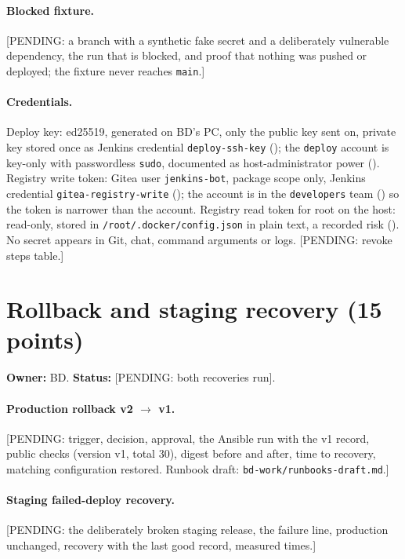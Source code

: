 \paragraph{Blocked fixture.} [PENDING: a branch with a synthetic fake secret and a deliberately vulnerable dependency, the run that is blocked, and proof that nothing was pushed
or deployed; the fixture never reaches \texttt{main}.]

\paragraph{Credentials.} Deploy key: ed25519, generated on BD's PC, only the public key sent on, private key stored once as Jenkins credential
\texttt{deploy-ssh-key} (); the \texttt{deploy} account is key-only with passwordless \texttt{sudo}, documented as host-administrator power ().
Registry write token: Gitea user \texttt{jenkins-bot}, package scope only, Jenkins credential \texttt{gitea-registry-write} (); the account is in the
\texttt{developers} team () so the token is narrower than the account. Registry read token for root on the host: read-only, stored in
\texttt{/root/.docker/config.json} in plain text, a recorded risk (). No secret appears in Git, chat, command arguments or logs. [PENDING: revoke steps table.]

\section{Rollback and staging recovery (15 points)}\label{Section:deliveryRecovery}
\textbf{Owner:} BD. \textbf{Status:} [PENDING: both recoveries run].

\paragraph{Production rollback v2 $\to$ v1.} [PENDING: trigger, decision, approval, the Ansible run with the v1 record, public checks (version v1, total 30),
digest before and after, time to recovery, matching configuration restored. Runbook draft: \texttt{bd-work/runbooks-draft.md}.]

\paragraph{Staging failed-deploy recovery.} [PENDING: the deliberately broken staging release, the failure line, production unchanged, recovery with the last good record, measured times.]

